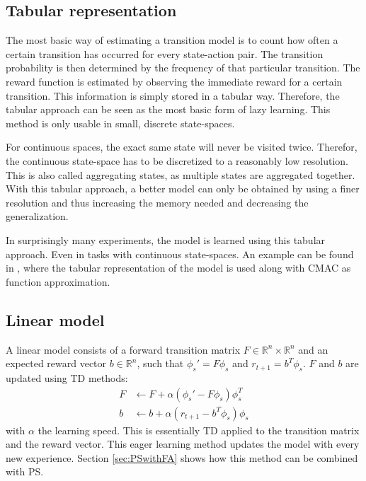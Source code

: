 \documentclass[a4paper,11pt]{mscLiterature}
\begin{document}
\subsection{Tabular representation}
The most basic way of estimating a transition model is to count how often a certain transition has occurred for every state-action pair. The transition probability is then determined by the frequency of that particular transition. The reward function is estimated by observing the immediate reward for a certain transition. This information is simply stored in a tabular way. Therefore, the tabular approach can be seen as the most basic form of lazy learning. This method is only usable in small, discrete state-spaces. 

For continuous spaces, the exact same state will never be visited twice. Therefor, the continuous state-space has to be discretized to a reasonably low resolution. This is also called aggregating states, as multiple states are aggregated together. With this tabular approach, a better model can only be obtained by using a finer resolution and thus increasing the memory needed and decreasing the generalization. 

In surprisingly many experiments, the model is learned using this tabular approach. Even in tasks with continuous state-spaces. An example can be found in \cite{KuvayevSutton:96}, where the tabular representation of the model is used along with CMAC as function approximation. 

\subsection{Linear model}\label{sec:linearModel}
A linear model consists of a forward transition matrix $F \in \mathbb{R}^n \times \mathbb{R}^n$ and an expected reward vector $b \in \mathbb{R}^n$, such that $\phi_s' = F \phi_s$ and $r_{t+1} = b^T \phi_s$. $F$ and $b$ are updated using TD methods:
\begin{equation}
	\begin{aligned}
	F &\leftarrow F + \alpha(\phi_s'-F\phi_s)\phi_s^T \\
	b &\leftarrow b + \alpha(r_{t+1}-b^T\phi_s)\phi_s
	\end{aligned}
\end{equation}
with $\alpha$ the learning speed. This is essentially TD applied to the transition matrix and the reward vector. This eager learning method updates the model with every new experience. Section \ref{sec:PSwithFA} shows how this method can be combined with PS.
\end{document}

